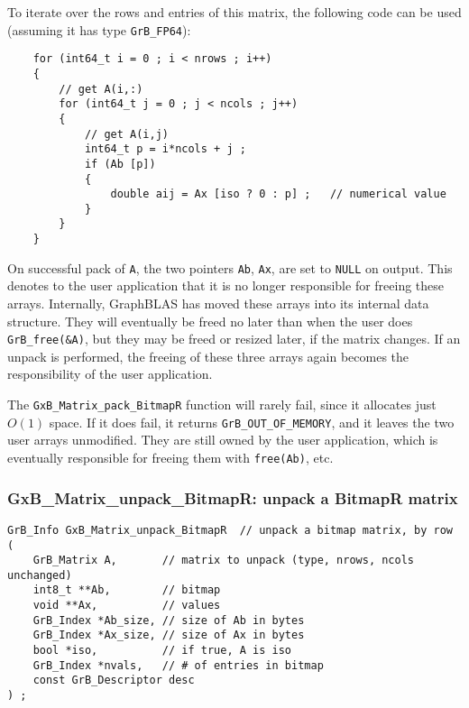\documentclass[12pt]{article}
\begin{document}
{\begin{itemize}
\end{itemize}

To iterate over the rows and entries of this matrix, the following code can be
used (assuming it has type \verb'GrB_FP64'):

    {\footnotesize
    \begin{verbatim}
    for (int64_t i = 0 ; i < nrows ; i++)
    {
        // get A(i,:)
        for (int64_t j = 0 ; j < ncols ; j++)
        {
            // get A(i,j)
            int64_t p = i*ncols + j ;
            if (Ab [p])
            {
                double aij = Ax [iso ? 0 : p] ;   // numerical value
            }
        }
    } \end{verbatim}}

On successful pack of \verb'A', the two pointers \verb'Ab', \verb'Ax',
are set to \verb'NULL' on output.  This denotes to the user
application that it is no longer responsible for freeing these arrays.
Internally, GraphBLAS has moved these arrays into its internal data structure.
They will eventually be freed no later than when the user does
\verb'GrB_free(&A)', but they may be freed or resized later, if the matrix
changes.  If an unpack is performed, the freeing of these three arrays again
becomes the responsibility of the user application.

The \verb'GxB_Matrix_pack_BitmapR' function will rarely fail, since it allocates
just $O(1)$ space.  If it does fail, it returns \verb'GrB_OUT_OF_MEMORY',
and it leaves the two user arrays unmodified.  They are still owned by
the user application, which is eventually responsible for freeing them with
\verb'free(Ab)', etc.

\newpage
\subsubsection{{\sf GxB\_Matrix\_unpack\_BitmapR:} unpack a BitmapR matrix}
\label{matrix_unpack_bitmapr}

\begin{mdframed}[userdefinedwidth=6in]
{\footnotesize
\begin{verbatim}
GrB_Info GxB_Matrix_unpack_BitmapR  // unpack a bitmap matrix, by row
(
    GrB_Matrix A,       // matrix to unpack (type, nrows, ncols unchanged)
    int8_t **Ab,        // bitmap
    void **Ax,          // values
    GrB_Index *Ab_size, // size of Ab in bytes
    GrB_Index *Ax_size, // size of Ax in bytes
    bool *iso,          // if true, A is iso
    GrB_Index *nvals,   // # of entries in bitmap
    const GrB_Descriptor desc
) ;
\end{verbatim}
} \end{mdframed}

}
\end{document}
